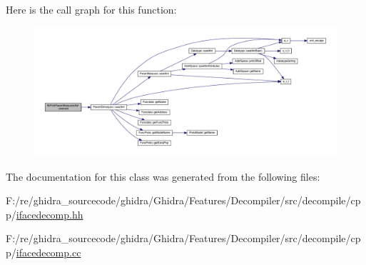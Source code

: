 Here is the call graph for this function\+:
\nopagebreak
\begin{figure}[H]
\begin{center}
\leavevmode
\includegraphics[width=350pt]{class_ifc_print_param_measures_xml_acb18a2d0a5b3aef6e417d2ab6ca48c5d_cgraph}
\end{center}
\end{figure}


The documentation for this class was generated from the following files\+:\begin{DoxyCompactItemize}
\item 
F\+:/re/ghidra\+\_\+sourcecode/ghidra/\+Ghidra/\+Features/\+Decompiler/src/decompile/cpp/\mbox{\hyperlink{ifacedecomp_8hh}{ifacedecomp.\+hh}}\item 
F\+:/re/ghidra\+\_\+sourcecode/ghidra/\+Ghidra/\+Features/\+Decompiler/src/decompile/cpp/\mbox{\hyperlink{ifacedecomp_8cc}{ifacedecomp.\+cc}}\end{DoxyCompactItemize}
